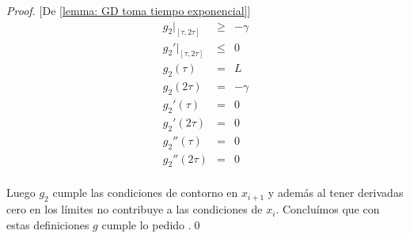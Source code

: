 \begin{proof}{[De \ref{lemma: GD toma tiempo exponencial}]}
	\begin{equation*}
		\begin{aligned}
			g_2 \vert_{\left[\tau, 2\tau\right]} & \geq & -\gamma \\
			g_2' \vert_{\left[\tau, 2\tau\right]} & \leq & 0 \\
			g_2(\tau) & = & L\\
			g_2(2\tau) & = & -\gamma\\
			g_2'(\tau) & = & 0 \\
			g_2'(2\tau) & = & 0 \\
			g_2''(\tau) & = & 0 \\
			g_2''(2\tau) & = & 0 \\
		\end{aligned}
	\end{equation*}
	
	Luego $g_2$ cumple las condiciones de contorno en $x_{i+1}$ y adem\'as al tener derivadas cero en los l\'imites no contribuye a las condiciones de $x_i$. Conclu\'imos que con estas definiciones $g$ cumple lo pedido .\qed
\end{proof}

